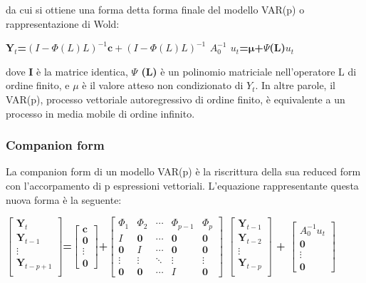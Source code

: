 \documentclass[12pt,a4paper,oneside,openright]{book}
\begin{document}
da cui si ottiene una forma detta forma finale del modello VAR(p) o rappresentazione di Wold:
\begin{center}
{\bfseries
$\mathbf{Y}_t$=$\left(I-\Phi(L)L\right)^{-1}\mathbf{c}+\left(I-\Phi(L)L\right)^{-1}$ $A_0^{-1}$ $u_t$=$\mathbf{\mu}$+$\Psi$(L)$u_t$
}
\end{center}

dove {\bfseries I} è la matrice identica, {\bfseries $\Psi$ (L)} è un polinomio matriciale nell'operatore L di ordine finito, e {\bfseries $\mu$} è il valore atteso non condizionato di {\bfseries $Y_t$}. In altre parole, il VAR(p), processo vettoriale autoregressivo di ordine finito, è equivalente a un processo in media mobile di ordine infinito.
\subsubsection{Companion form}
La companion form di un modello VAR(p) è la riscrittura della sua reduced form con l'accorpamento di p espressioni vettoriali. L'equazione rappresentante questa nuova forma è la seguente:
\begin{center}
{\bfseries
$\begin{bmatrix}\mathbf{Y}_t\\\mathbf{Y}_{t-1}\\\vdots\\\mathbf{Y}_{t-p+1}\\\end{bmatrix}$=$\begin{bmatrix}\mathbf{c}\\\mathbf{0}\\\vdots\\\mathbf{0}\end{bmatrix}$+$\begin{bmatrix}\Phi_1 & \Phi_2 & \cdots & \Phi_{p-1} & \Phi_p\\ I & \mathbf{0} & \cdots & \mathbf{0} & \mathbf{0}\\ \mathbf{0} & I & \cdots & \mathbf{0} & \mathbf{0}\\ \vdots & \vdots & \ddots & \vdots & \vdots\\ \mathbf{0} & \mathbf{0} & \cdots & I & \mathbf{0}\end{bmatrix}$ $\begin{bmatrix}\mathbf{Y}_{t-1}\\\mathbf{Y}_{t-2}\\\vdots\\\mathbf{Y}_{t-p}\\\end{bmatrix}$ + $\begin{bmatrix}A_0^{-1}u_t\\ \mathbf{0}\\ \vdots\\ \mathbf{0}\end{bmatrix}$
}
\end{center}
\end{document}
